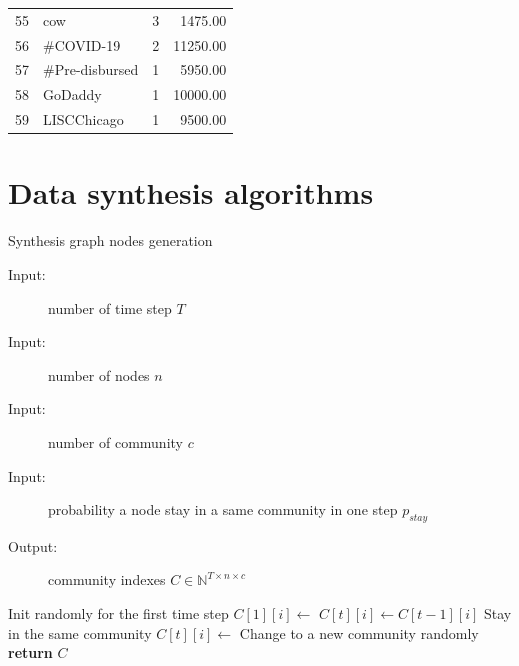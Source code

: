 \begin{longtable}{|c|l|r|r|}
	55          & cow                              & 3                      & 1475.00                      \\
	56          & \#COVID-19                       & 2                      & 11250.00                     \\
	57          & \#Pre-disbursed                  & 1                      & 5950.00                      \\
	58          & GoDaddy                          & 1                      & 10000.00                     \\
	59          & LISCChicago                      & 1                      & 9500.00                      \\
\end{longtable}

\chapter{Data synthesis algorithms}

\begin{algorithm}
	\noindent
	\caption{Synthesis graph nodes generation}
	\label{alg:appendix-synthesis_graph_nodes}
	\begin{description}
		\item[Input:] number of time step $T$
		\item[Input:] number of nodes $n$
		\item[Input:] number of community $c$
		\item[Input:] probability a node stay in a same community in one step $p_{stay}$
		\item[Output:] community indexes $C \in \mathbb{N}^{T \times n \times c}$
	\end{description}
	\begin{algorithmic}[1]
		\Comment Init randomly for the first time step
		\State $C[1][i] \gets$ 
		\EndFor
		\State $C[t][i] \gets C[t-1][i]$
		\Comment Stay in the same community
		\Else
		\State $C[t][i] \gets$ 
		\Comment Change to a new community randomly
		\EndIf
		\EndFor
		\EndFor
		\State \textbf{return} $C$
		\EndFunction
	\end{algorithmic}
\end{algorithm}


